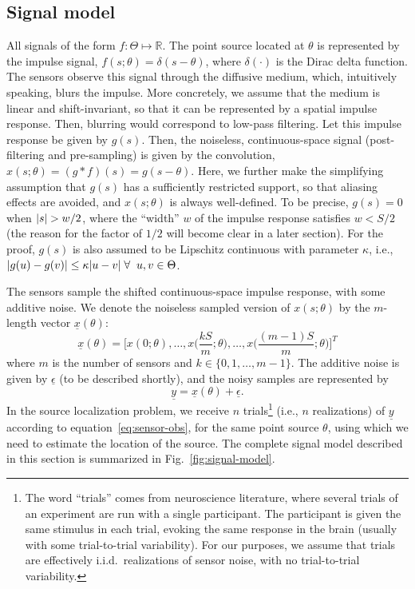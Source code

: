 \documentclass[conference]{IEEEtran}
\providecommand{\v}{}
\renewcommand{\v}[1]{\underline{#1}}
\DeclarePairedDelimiter\abs{\lvert}{\rvert}
\begin{document}
\subsection{Signal model}
\label{sec:signal-model}

All signals of the form $f:\Theta\mapsto\mathbb{R}$.  The point source located at $\theta$
is represented by the impulse signal, $f(s;\theta) = \delta(s - \theta)$, where
$\delta(\cdot)$ is the Dirac delta function.  The sensors observe this signal
through the diffusive medium, which, intuitively speaking, blurs the impulse.
More concretely, we assume that the medium is linear and shift-invariant, so
that it can be represented by a spatial impulse response. Then, blurring would
correspond to low-pass filtering.  Let this impulse response be given by
$g(s)$. Then, the noiseless, continuous-space signal (post-filtering and
pre-sampling) is given by the convolution, $x(s; \theta) = (g*f)(s) = g(s -
\theta)$. Here, we further make the simplifying assumption that $g(s)$ has a
sufficiently restricted support, so that aliasing effects are avoided, and
$x(s; \theta)$ is always well-defined. To be precise, $g(s) = 0$ when $\abs{s}
> w/2$, where the ``width'' $w$ of the impulse response satisfies $w < S / 2$
(the reason for the factor of $1/2$ will become clear in a later section). For
the proof, $g(s)$ is also assumed to be Lipschitz continuous with parameter
$\kappa$, i.e., $\abs{g(u) - g(v)} \leq \kappa \abs{u - v} \; \forall \;\; u, v
\in \Theta$.

The sensors sample the shifted continuous-space impulse response, with some
additive noise. We denote the noiseless sampled version of $x(s; \theta)$ by
the $m$-length vector $\v x(\theta)$:
\begin{equation} \label{eq:sampled-signal}
	\v x(\theta) = \bigg[x(0; \theta), \ldots, x\Big(\frac{kS}{m}; \theta\Big), \ldots, x\Big(\frac{(m-1)S}{m}; \theta\Big)\bigg]^T
\end{equation}
where $m$ is the number of sensors and $k \in \{0, 1, \ldots, m-1\}$. The
additive noise is given by $\v \epsilon$ (to be described shortly), and the
noisy samples are represented by
\begin{equation} \label{eq:sensor-obs}
	\v y = \v x(\theta) + \v \epsilon.
\end{equation}
In the source localization problem, we receive $n$ trials\footnote{The word
``trials'' comes from neuroscience literature, where several trials of an
experiment are run with a single participant. The participant is given the same
stimulus in each trial, evoking the same response in the brain (usually with
some trial-to-trial variability). For our purposes, we assume that trials are
effectively i.i.d.\ realizations of sensor noise, with no trial-to-trial
variability.} (i.e., $n$ realizations) of $\v y$ according to
equation~\eqref{eq:sensor-obs}, for the same point source $\theta$, using which
we need to estimate the location of the source.
The complete signal model described in this section is summarized in
Fig.~\ref{fig:signal-model}.
\end{document}
